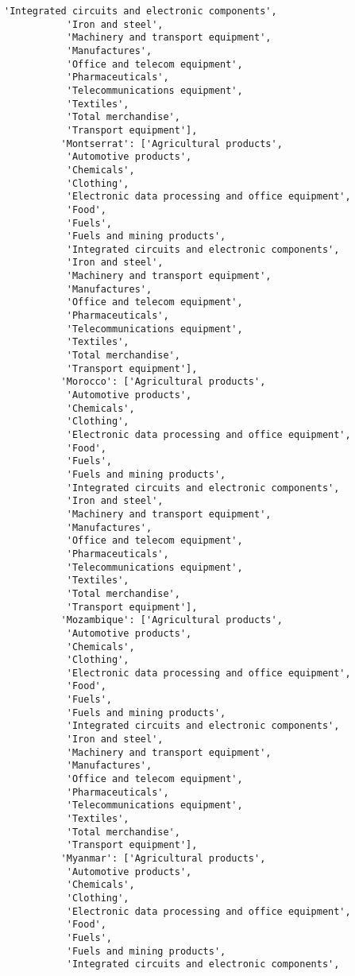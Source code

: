 \documentclass[11pt]{article}
\begin{document}
\begin{Verbatim}[commandchars=\\\{\}]
           'Integrated circuits and electronic components',
           'Iron and steel',
           'Machinery and transport equipment',
           'Manufactures',
           'Office and telecom equipment',
           'Pharmaceuticals',
           'Telecommunications equipment',
           'Textiles',
           'Total merchandise',
           'Transport equipment'],
          'Montserrat': ['Agricultural products',
           'Automotive products',
           'Chemicals',
           'Clothing',
           'Electronic data processing and office equipment',
           'Food',
           'Fuels',
           'Fuels and mining products',
           'Integrated circuits and electronic components',
           'Iron and steel',
           'Machinery and transport equipment',
           'Manufactures',
           'Office and telecom equipment',
           'Pharmaceuticals',
           'Telecommunications equipment',
           'Textiles',
           'Total merchandise',
           'Transport equipment'],
          'Morocco': ['Agricultural products',
           'Automotive products',
           'Chemicals',
           'Clothing',
           'Electronic data processing and office equipment',
           'Food',
           'Fuels',
           'Fuels and mining products',
           'Integrated circuits and electronic components',
           'Iron and steel',
           'Machinery and transport equipment',
           'Manufactures',
           'Office and telecom equipment',
           'Pharmaceuticals',
           'Telecommunications equipment',
           'Textiles',
           'Total merchandise',
           'Transport equipment'],
          'Mozambique': ['Agricultural products',
           'Automotive products',
           'Chemicals',
           'Clothing',
           'Electronic data processing and office equipment',
           'Food',
           'Fuels',
           'Fuels and mining products',
           'Integrated circuits and electronic components',
           'Iron and steel',
           'Machinery and transport equipment',
           'Manufactures',
           'Office and telecom equipment',
           'Pharmaceuticals',
           'Telecommunications equipment',
           'Textiles',
           'Total merchandise',
           'Transport equipment'],
          'Myanmar': ['Agricultural products',
           'Automotive products',
           'Chemicals',
           'Clothing',
           'Electronic data processing and office equipment',
           'Food',
           'Fuels',
           'Fuels and mining products',
           'Integrated circuits and electronic components',

\end{Verbatim}
\end{document}
